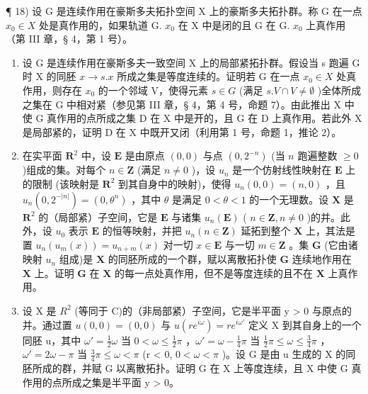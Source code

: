 ¶ 18) 设 G 是连续作用在豪斯多夫拓扑空间 X 上的豪斯多夫拓扑群。称 G 在一点 \(x_{0} \in X\) 处是真作用的，如果轨道 G. \(x_{0}\) 在 X 中是闭的且 G 在 G. \(x_{0}\) 上真作用（第 III 章，§ 4，第 1 号）。

\begin{enumerate}
\def\labelenumi{\alph{enumi})}
\item
  设 G 是连续作用在豪斯多夫一致空间 X 上的局部紧拓扑群。假设当 s 跑遍 G 时 X 的同胚 \(x \rightarrow s.x\) 所成之集是等度连续的。证明若 G 在一点 \(x_{0} \in X\) 处真作用，则存在 \(x_{0}\) 的一个邻域 V，使得元素 \(s \in G\) (满足 \(s.V \cap V \neq \emptyset\) )全体所成之集在 G 中相对紧（参见第 III 章，§ 4，第 4 号，命题 7）。由此推出 X 中使 G 真作用的点所成之集 D 在 X 中是开的，且 G 在 D 上真作用。若此外 X 是局部紧的，证明 D 在 X 中既开又闭（利用第 1 号，命题 1，推论 2）。
\item
  在实平面 \(\mathbf{R}^2\) 中，设 \(\mathbf{E}\) 是由原点 \((0,0)\) 与点 \((0,2^{-n})\) (当 \(n\) 跑遍整数 \(\geqslant 0\) )组成的集。对每个 \(n\in \mathbf{Z}\) (满足 \(n\neq 0\) )，设 \(u_{n}\) 是一个仿射线性映射在 \(\mathbf{E}\) 上的限制 (该映射是 \(\mathbf{R}^2\) 到其自身中的映射)，使得 \(u_{n}(0,0) = (n,0)\) ，且 \(u_{n}(0,2^{-|n|}) = (0,\theta^{n})\) ，其中 \(\theta\) 是满足 \(0 <   \theta <  1\) 的一个无理数。设 \(\mathbf{X}\) 是 \(\mathbf{R}^2\) 的（局部紧）子空间，它是 \(\mathbf{E}\) 与诸集 \(u_{n}(\mathbf{E})\) ( \(n\in \mathbf{Z},n\neq 0\) )的并。此外，设 \(u_{0}\) 表示 \(\mathbf{E}\) 的恒等映射，并把 \(u_{n}(n\in \mathbf{Z})\) 延拓到整个 \(\mathbf{X}\) 上，其法是置 \(u_{n}(u_{m}(x)) = u_{n + m}(x)\) 对一切 \(x\in \mathbf{E}\) 与一切 \(m\in \mathbf{Z}\) 。集 \(\mathbf{G}\) (它由诸映射 \(u_{n}\) 组成)是 \(\mathbf{X}\) 的同胚所成的一个群，赋以离散拓扑使 \(\mathbf{G}\) 连续地作用在 \(\mathbf{X}\) 上。证明 \(\mathbf{G}\) 在 \(\mathbf{X}\) 的每一点处真作用，但不是等度连续的且不在 \(\mathbf{X}\) 上真作用。
\item
  设 X 是 \(R^{2}\) (等同于 C)的（非局部紧）子空间，它是半平面 y \textgreater{} 0 与原点的并。通过置 \(u(0, 0) = (0, 0)\) 与 \(u(re^{i\omega}) = re^{i\omega'}\) 定义 X 到其自身上的一个同胚 u，其中 \(\omega' = \frac{1}{2}\omega\) 当 \(0 < \omega \leqslant \frac{1}{2}\pi\) ，\(\omega' = \omega - \frac{1}{4}\pi\) 当 \(\frac{1}{2}\pi \leqslant \omega \leqslant \frac{3}{4}\pi\) ，\(\omega' = 2\omega - \pi\) 当 \(\frac{3}{4}\pi \leqslant \omega < \pi\) (r \textless{} 0, \(0 < \omega < \pi\) )。设 G 是由 u 生成的 X 的同胚所成的群，并赋 G 以离散拓扑。证明 G 在 X 上等度连续，且 X 中使 G 真作用的点所成之集是半平面 y \textgreater{} 0。
\end{enumerate}

